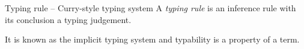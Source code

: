 \begin{frame}{Typing rule -- Curry-style typing system}
  A \emph{typing rule} is an inference rule with its conclusion a
  typing judgement.
  
  \begin{prooftree}
  \end{prooftree}
  \begin{prooftree}
  \end{prooftree}
  \begin{prooftree}
  \end{prooftree}

It is known as the implicit typing system and typability is a property of a term.
\end{frame}


%
%

